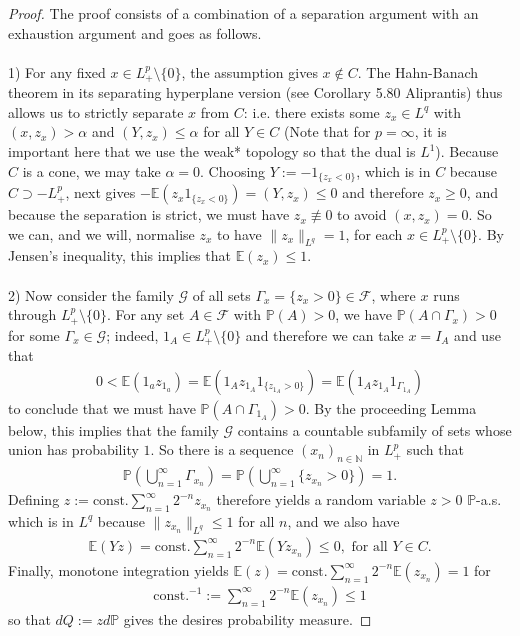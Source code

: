 \documentclass[12pt,a4paper, twoside]{article}
\theoremstyle{definition}
\newcommand{\EE}{\mathbb{E}} %
\newcommand{\PP}{\mathbb{P}} %
\begin{document}
\begin{proof}
The proof consists of a combination of a separation argument with an exhaustion argument and goes as follows. \\
\\
1) For any fixed $x \in L_+^p \setminus \{0\}$, the assumption gives $x \notin C$. The Hahn-Banach theorem in its separating hyperplane version (see Corollary 5.80 Aliprantis) thus allows us to strictly separate $x$ from $C$: i.e. there exists some $z_x \in L^q$ with $(x, z_x) > \alpha$ and $(Y, z_x) \leq \alpha$ for all $Y \in C$ (Note that for $p= \infty$, it is important here that we use the weak* topology so that the dual is $L^1$). Because $C$ is a cone,  we may take $\alpha = 0$. Choosing $Y:= -1_{\{ z_x < 0\}}$, which is in $C$ because $C \supset -L_+^p$, next gives $- \EE(z_x 1_{\{ z_x < 0\}})=(Y,z_x) \leq 0$ and therefore $z_x \geq 0$, and because the separation is strict,  we must have $z_x \not\equiv 0$ to avoid $(x, z_x)=0$. So we can, and we will, normalise $z_x$ to have $\|z_x\|_{L^q}=1$, for each $x \in L_+^p \setminus \{0\}$. By Jensen's inequality, this implies that $\EE(z_x) \leq 1$.  
\\\\
2) Now consider the family $\mathcal{G}$ of all sets $\Gamma_x= \{ z_x >0\} \in \mathcal{F}$, where $x$ runs through $L_+^p \setminus \{0\}$. For any set $A \in \mathcal{F}$ with $\PP(A) >0$, we have $\PP(A \cap \Gamma_x) >0$ for some $\Gamma_x \in \mathcal{G}$; indeed, $1_A \in L_+^p \setminus \{0\}$ and therefore we can take $x= I_A$ and use that 
\begin{align*}
0 < \EE(1_a z_{1_a}) = \EE(1_A z_{1_A} 1_{\{ z_{1_A}>0\}}) = \EE(1_A z_{1_A} 1_{ \Gamma_{1_A}})
\end{align*}
to conclude that we must have $\PP(A \cap \Gamma_{1_A}) >0$. By the proceeding Lemma below, this implies that the family $\mathcal{G}$ contains a countable subfamily of sets whose union has probability $1$. So there is a sequence $(x_n)_{n \in \mathbb{N}}$ in $L_+^p$ such that 
\begin{align*}
\PP \left( \bigcup_{n=1}^\infty \Gamma_{x_n} \right) = \PP \left( \bigcup_{n=1}^\infty \{ z_{x_n} >0\} \right) =1.
\end{align*}
Defining $z:= \text{const.}\sum_{n=1}^\infty 2^{-n} z_{x_n}$ therefore yields a random variable $z>0$ $\PP$-a.s. which is in $L^q$ because $\|z_{x_n}\|_{L^q} \leq 1$ for all $n$, and we also have 
\begin{align*}
\EE(Yz) = \text{const.} \sum_{n=1}^\infty 2^{-n} \EE(Y z_{x_n} ) \leq 0, \text{ for all } Y \in C. 
\end{align*}
Finally, monotone integration yields $\EE(z) = \text{const.} \sum_{n=1}^\infty 2^{-n} \EE(z_{x_n}) =1$ for
\begin{align*}
\text{const.}^{-1}:= \sum_{n=1}^\infty 2^{-n} \EE(z_{x_n})  \leq 1
\end{align*}
so that $dQ:= z d \PP$ gives the desires probability measure.
\end{proof}
\end{document}
